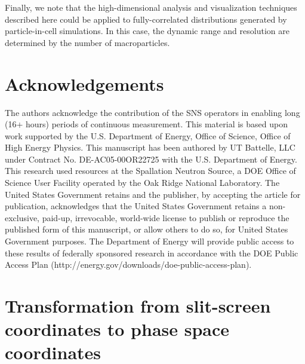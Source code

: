 \documentclass[%
 reprint,
nofootinbib,
 amsmath,amssymb,
 aps,
prstab,
]{revtex4-2}
\begin{document}
Finally, we note that the high-dimensional analysis and visualization techniques described here could be applied to fully-correlated distributions generated by particle-in-cell simulations. In this case, the dynamic range and resolution are determined by the number of macroparticles. 

\section{Acknowledgements}
The authors acknowledge the contribution of the SNS operators in enabling long (16+ hours) periods of continuous measurement. 
This material is based upon work supported by the U.S. Department of Energy, Office of Science, Office of High Energy Physics. This manuscript has been authored by UT Battelle, LLC under Contract No. DE-AC05-00OR22725 with the U.S. Department of Energy. This research used resources at the Spallation Neutron Source, a DOE Office of Science User Facility operated by the Oak Ridge National Laboratory. The United States Government retains and the publisher, by accepting the article for publication, acknowledges that the United States Government retains a non-exclusive, paid-up, irrevocable, world-wide license to publish or reproduce the published form of this manuscript, or allow others to do so, for United States Government purposes. The Department of Energy will provide public access to these results of federally sponsored research in accordance with the DOE Public Access Plan (http://energy.gov/downloads/doe-public-access-plan).




\appendix

\section{Transformation from slit-screen coordinates to phase space coordinates}\label{app-transform}
\end{document}
